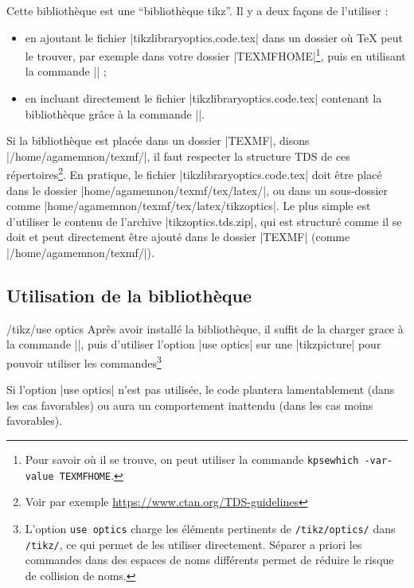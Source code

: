 \documentclass[a4paper]{ltxdoc}
\begin{document}
Cette bibliothèque est une \enquote{bibliothèque tikz}. Il y a deux façons de l'utiliser : 
\begin{itemize}
  \item en ajoutant le fichier |tikzlibraryoptics.code.tex| dans un dossier où \TeX{} peut le trouver, par exemple dans votre dossier |TEXMFHOME|\footnote{Pour savoir où il se trouve, on peut utiliser la commande \verb|kpsewhich -var-value TEXMFHOME|. }, puis en utilisant la commande |\usetikzlibrary{optics}| ;
  \item en incluant directement le fichier |tikzlibraryoptics.code.tex| contenant la bibliothèque grâce à la commande ||.
\end{itemize}

Si la bibliothèque est placée dans un dossier |TEXMF|, disons |/home/agamemnon/texmf/|, il faut respecter la structure TDS de ces répertoires\footnote{Voir par exemple \url{https://www.ctan.org/TDS-guidelines}}. En pratique, le fichier |tikzlibraryoptics.code.tex| doit être placé dans le dossier |home/agamemnon/texmf/tex/latex/|, ou dans un sous-dossier comme |home/agamemnon/texmf/tex/latex/tikzoptics|. Le plus simple est d'utiliser le contenu de l'archive |tikzoptics.tds.zip|, qui est structuré comme il se doit et peut directement être ajouté dans le dossier |TEXMF| (comme |/home/agamemnon/texmf/|).

\subsection{Utilisation de la bibliothèque}

\begin{key}{/tikz/use optics}
Après avoir installé la bibliothèque, il suffit de la charger grace à la commande |\usetikzlibrary{optics}|, puis d'utiliser l'option |use optics| sur une |tikzpicture| pour pouvoir utiliser les commandes\footnote{L'option \texttt{use optics} charge les éléments pertinents de \texttt{/tikz/optics/} dans \texttt{/tikz/}, ce qui permet de les utiliser directement. Séparer a priori les commandes dans des espaces de noms différents permet de réduire le risque de collision de noms.}

\begin{codeexample}[width=5cm]
\end{codeexample}

Si l'option |use optics| n'est pas utilisée, le code plantera lamentablement (dans les cas favorables) ou aura un comportement inattendu (dans les cas moins favorables).
\end{key}
\end{document}
